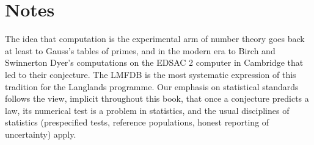 \section{Notes}

The idea that computation is the experimental arm of number theory goes back at least to Gauss's tables of primes, and in the modern era to Birch and Swinnerton Dyer's computations on the EDSAC 2 computer in Cambridge that led to their conjecture. The LMFDB is the most systematic expression of this tradition for the Langlands programme. Our emphasis on statistical standards follows the view, implicit throughout this book, that once a conjecture predicts a law, its numerical test is a problem in statistics, and the usual disciplines of statistics (prespecified tests, reference populations, honest reporting of uncertainty) apply.
